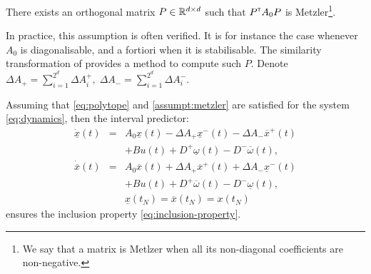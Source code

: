 \documentclass{article}
\begin{document}
\begin{assumption}
\label{assumpt:metzler}
There exists an orthogonal matrix $P\in\mathbb{R}^{d\times d}$ such that $P^{\mathsf{\scriptscriptstyle T}} A_0 P$ is Metzler\footnote{We say that a matrix is Metlzer when all its non-diagonal coefficients are non-negative.}.
\end{assumption}
In practice, this assumption is often verified. It is for instance the case whenever $A_0$ is diagonalisable, and a fortiori when it is stabilisable. The similarity transformation of \citep{Efimov_a2013} provides a method to compute such $P$. Denote $
\Delta A_{+}=\sum_{i=1}^{2^d}\Delta A_{i}^{+},\;\Delta A_{-}=\sum_{i=1}^{2^d}\Delta A_{i}^{-}$.

\begin{theorem}
\label{thm:predictor}
Assuming that \eqref{eq:polytope} and \autoref{assumpt:metzler} are satisfied for the system \eqref{eq:dynamics}, then the interval predictor:
\begin{eqnarray}
\dot{\underline{x}}(t) & = & A_{0}\underline{x}(t)-\Delta A_{+}\underline{x}^{-}(t)-\Delta A_{-}\overline{x}^{+}(t)\nonumber \\
 &  & +Bu(t)+D^{+}\underline{\omega}(t)-D^{-}\overline{\omega}(t),\nonumber\\
\dot{\overline{x}}(t) & = & A_{0}\overline{x}(t)+\Delta A_{+}\overline{x}^{+}(t)+\Delta A_{-}\underline{x}^{-}(t) \label{eq:interval-predictor} \\
 &  & +Bu(t)+D^{+}\overline{\omega}(t)-D^{-}\underline{\omega}(t),\nonumber \\
 &  & \underline{x}(t_N)=\overline{x}(t_N)={x}(t_N)\nonumber 
\end{eqnarray}
ensures the inclusion property \eqref{eq:inclusion-property}.
\end{theorem}
\end{document}
